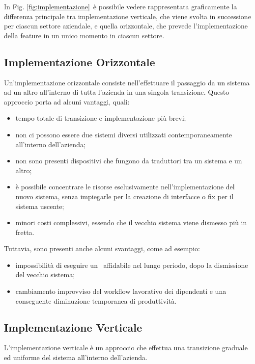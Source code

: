 	In Fig. \ref{fig:implementazione}~è possibile vedere rappresentata graficamente la differenza principale tra implementazione verticale, che viene svolta in successione per ciascun settore aziendale, e quella orizzontale, che prevede l'implementazione della feature in un unico momento in ciascun settore.

\newpage
\subsection{Implementazione Orizzontale}

	Un'implementazione orizzontale consiste nell'effettuare il passaggio da un sistema ad un altro all'interno di tutta l'azienda in una singola transizione.
	Questo approccio porta ad alcuni vantaggi, quali:
	\begin{itemize}[noitemsep]
		\renewcommand\labelitemi{--}
		\item tempo totale di transizione e implementazione più brevi;
		\item non ci possono essere due sistemi diversi utilizzati contemporaneamente all’interno dell’azienda;
		\item non sono presenti dispositivi che fungono da traduttori tra un sistema e un altro;
		\item è possibile concentrare le risorse esclusivamente nell'implementazione del nuovo sistema, senza impiegarle per la creazione di interfacce o fix per il sistema uscente;
		\item minori costi complessivi, essendo che il vecchio sistema viene dismesso più in fretta.
	\end{itemize}
	
	Tuttavia, sono presenti anche alcuni svantaggi, come ad esempio:
	\begin{itemize}[noitemsep]
		\renewcommand\labelitemi{--}
		\item impossibilità di eseguire un \rollback~affidabile nel lungo periodo, dopo la dismissione del vecchio sistema;
		\item cambiamento improvviso del workflow lavorativo dei dipendenti e una conseguente diminuzione temporanea di produttività.
	\end{itemize}

\subsection{Implementazione Verticale}

	L'implementazione verticale è un approccio che effettua una transizione graduale ed uniforme del sistema all'interno dell'azienda.
	
